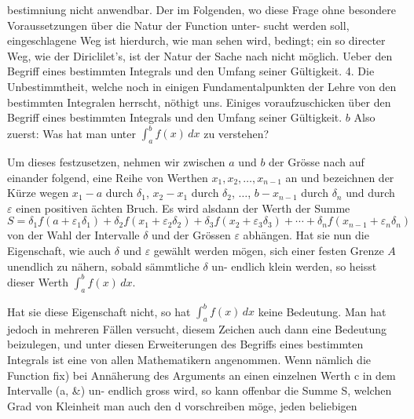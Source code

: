 \documentclass[11pt,a4paper]{article}
\begin{document}
{{%
bestimniung  nicht  anwendbar.  Der  im  Folgenden,  wo  diese  Frage
ohne  besondere  Voraussetzungen  über  die  Natur  der  Function  unter-
sucht werden  soll,  eingeschlagene  Weg  ist  hierdurch,  wie  man  sehen
wird,  bedingt;  ein  so  directer  Weg,  wie  der  Diriclilet's,  ist  der  Natur
der  Sache  nach  nicht  möglich.
Ueber  den  Begriff  eines  bestimmten  Integrals  und  den  Umfang
seiner  Gültigkeit.
4.
Die  Unbestimmtheit,  welche  noch  in  einigen  Fundamentalpunkten
der  Lehre  von  den  bestimmten  Integralen  herrscht,  nöthigt  uns.
Einiges  voraufzuschicken  über  den  Begriff  eines  bestimmten  Integrals
und  den  Umfang  seiner  Gültigkeit.
$b$
Also  zuerst:  Was  hat  man  unter  $\int_a^b f(x)\, dx$  zu  verstehen?

Um  dieses  festzusetzen,  nehmen  wir  zwischen  $a$  und  $b$  der  Grösse
nach  auf  einander  folgend,  eine  Reihe  von  Werthen  $x_1, x_2, \ldots, x_{n-1}$
an  und  bezeichnen  der  Kürze  wegen  $x_1 - a$  durch  $\delta_1$,  $x_2 - x_1$  durch
$\delta_2$,  $\ldots$,  $b - x_{n-1}$  durch  $\delta_n$  und  durch  $\varepsilon$  einen  positiven  ächten  Bruch.
Es  wird  alsdann  der  Werth  der  Summe
\[ S = \delta_1 f(a + \varepsilon_1 \delta_1) + \delta_2 f(x_1 + \varepsilon_2 \delta_2) + \delta_3 f(x_2 + \varepsilon_3 \delta_3) + \cdots + \delta_n f(x_{n-1} + \varepsilon_n \delta_n) \]
von  der  Wahl  der  Intervalle  $\delta$  und  der  Grössen  $\varepsilon$  abhängen.  Hat  sie
nun  die  Eigenschaft,  wie  auch  $\delta$  und  $\varepsilon$  gewählt  werden  mögen,  sich
einer  festen  Grenze  $A$  unendlich  zu  nähern,  sobald  sämmtliche  $\delta$  un-
endlich  klein  werden,  so  heisst  dieser  Werth  $\int_a^b f(x)\, dx$.

Hat  sie  diese  Eigenschaft  nicht,  so  hat  $\int_a^b f(x)\, dx$  keine  Bedeutung.
Man  hat  jedoch  in  mehreren  Fällen  versucht,  diesem  Zeichen  auch
dann  eine  Bedeutung  beizulegen,  und  unter  diesen  Erweiterungen  des
Begriffs  eines  bestimmten  Integrals  ist  eine  von  allen  Mathematikern
angenommen.  Wenn  nämlich  die  Function  fix)  bei  Annäherung  des
Arguments  an  einen  einzelnen  Werth  c  in  dem  Intervalle  (a,  \&)  un-
endlich gross  wird,  so  kann  offenbar  die  Summe  S,  welchen  Grad
von  Kleinheit  man  auch   den   d  vorschreiben   möge,  jeden  beliebigen
\newpage

}}
\end{document}
